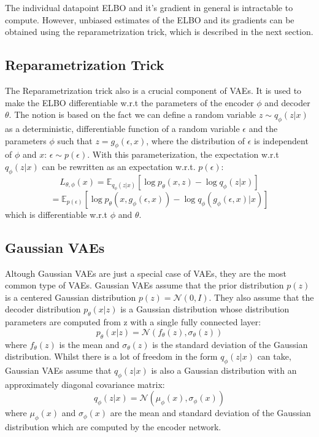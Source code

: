 The individual datapoint ELBO and it's gradient in general is intractable to compute. However, unbiased estimates of the ELBO and its gradients can be obtained using the reparametrization trick, which is described in the next section\cite{Kingma_2019}.


\subsection{Reparametrization Trick}

The Reparametrization trick also  is a crucial component of VAEs. It is used to make the ELBO differentiable w.r.t the parameters of the encoder $\phi$ and decoder $\theta$. The notion is based on the fact we can define a random variable $z \sim q_{\phi}(z|x)$ as a deterministic, differentiable function of a random variable $\epsilon$ and the parameters $\phi$ such that $z = g_{\phi}(\epsilon, x)$, where the distribution of $\epsilon$ is independent of $\phi$ and $x$: $\epsilon \sim p(\epsilon)$. With this parameterization, the expectation w.r.t $q_{\phi}(z|x)$ can be rewritten as an expectation w.r.t. $p(\epsilon)$: \[ L_{\theta, \phi}(x) = \mathbb{E}_{q_{\phi}(z|x)} [\log p_{\theta}(x, z) - \log q_{\phi}(z|x)] \]
\[ = \mathbb{E}_{p(\epsilon)} [\log p_{\theta}(x, g_{\phi}(\epsilon, x)) - \log q_{\phi}(g_{\phi}(\epsilon, x)|x)] \] which is differentiable w.r.t $\phi$ and $\theta$.



\subsection{Gaussian VAEs}

Altough Gaussian VAEs are just a special case of VAEs, they are the most common type of VAEs. Gaussian VAEs assume that the prior distribution $p(z)$ is a centered Gaussian distribution $ p(z) = \mathcal{N}(0, I)$. They also assume that the decoder distribution $p_{\theta}(x|z)$ is a Gaussian distribution whose distribution parameters are computed from z with a single fully connected layer: 
\[ p_{\theta}(x|z) = \mathcal{N}(f_{\theta}(z), \sigma_{\theta}(z)) \]
where $f_{\theta}(z)$ is the mean and $\sigma_{\theta}(z)$ is the standard deviation of the Gaussian distribution. Whilst there is a lot of freedom in the form $q_{\phi}(z|x)$ can take, Gaussian VAEs assume that $q_{\phi}(z|x)$ is also a Gaussian distribution with an approximately diagonal covariance matrix: 
\[ q_{\phi}(z|x) = \mathcal{N}(\mu_{\phi}(x), \sigma_{\phi}(x)) \]
where $\mu_{\phi}(x)$ and $\sigma_{\phi}(x)$ are the mean and standard deviation of the Gaussian distribution which are computed by the encoder network.

